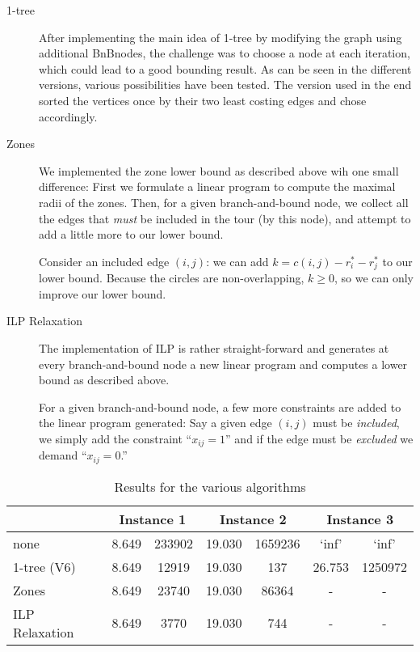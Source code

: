 \documentclass{article}
\begin{document}

\begin{description}
\item[1-tree] After implementing the main idea of 1-tree by modifying the graph using additional BnBnodes, the challenge was to choose a node at each iteration, which could lead to a good bounding result. As can be seen in the different versions, various possibilities have been tested. The version used in the end sorted the vertices once by their two least costing edges and chose accordingly.
\item[Zones] We implemented the zone lower bound as described above
  wih one small difference: First we formulate a linear program to
  compute the maximal radii of the zones. Then, for a given
  branch-and-bound node, we collect all the edges that \emph{must} be
  included in the tour (by this node), and attempt to add a little
  more to our lower bound.

  Consider an included edge $(i,j)$: we can add $k = c(i,j) - r_i^* -
  r_j^*$ to our lower bound. Because the circles are non-overlapping,
  $k \geq 0$, so we can only improve our lower bound.
\item[ILP Relaxation] The implementation of ILP is rather
  straight-forward and generates at every branch-and-bound node a new
  linear program and computes a lower bound as described above.

  For a given branch-and-bound node, a few more constraints are added
  to the linear program generated: Say a given edge $(i,j)$ must be
  \emph{included}, we simply add the constraint ``$x_{ij} = 1$'' and if
  the edge must be \emph{excluded} we demand ``$x_{ij} = 0$.''
\end{description}

\begin{table}[h!]
  \centering
  \begin{tabular}{l|c|c|c|c|c|c}
    & \multicolumn{2}{c|}{Instance 1} & \multicolumn{2}{|c|}{Instance 2} & \multicolumn{2}{|c}{Instance 3} \\\hline
    none & 8.649 & 233902 &  19.030 & 1659236 & `inf' & `inf' \\ 
    1-tree (V6) & 8.649 & 12919 &  19.030 & 137 & 26.753 & 1250972 \\ 
    Zones & 8.649 & 23740 & 19.030 & 86364 & - & - \\
    ILP Relaxation & 8.649 & 3770 & 19.030 & 744 & - & - \\
  \end{tabular}
  \caption{Results for the various algorithms}
  \label{tab:results}
\end{table}
\end{document}
